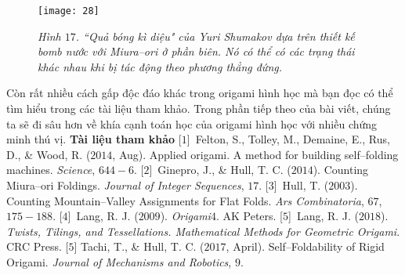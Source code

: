 \begin{multicols}{2}
\begin{figure}[H]
		\vspace*{4pt}
		\texttt{[image: 28]}
		\caption{\small\textit{\color{toanhocdoisong}Hình $17$. ``Quả bóng kì diệu" của Yuri Shumakov dựa trên thiết kế bomb nước với Miura--ori ở phần biên. Nó có thể có các trạng thái khác nhau khi bị tác động theo phương thẳng đứng.}}
		\vspace*{-5pt}
	\end{figure}
	Còn rất nhiều cách gấp độc đáo khác trong origami hình học mà bạn đọc có thể tìm hiểu trong các tài liệu tham khảo. Trong phần tiếp theo của bài viết, chúng ta sẽ đi sâu hơn về khía cạnh  toán học của origami hình học với nhiều chứng minh thú vị.
	\vskip 0.1cm
	\textbf{\color{toanhocdoisong}Tài liệu tham khảo}
	\vskip 0.1cm
	[$1$]~Felton, S., Tolley, M., Demaine, E., Rus, D., \& Wood, R. ($2014$, Aug). Applied origami. A method for building self--folding machines. \textit{Science}, $644-6$.
	\vskip 0.1cm
	[$2$]~Ginepro, J., \& Hull, T. C. ($2014$). Counting Miura--ori Foldings. \textit{Journal of Integer Sequences}, $17$.
	\vskip 0.1cm
	[$3$]~Hull, T. ($2003$). Counting Mountain--Valley Assignments for Flat Folds. \textit{Ars Combinatoria}, $67$, $175-188$.
	\vskip 0.1cm
	[$4$]~Lang, R. J. ($2009$). \textit{Origami$4$}. AK Peters.
	\vskip 0.1cm
	[$5$]~Lang, R. J. ($2018$). \textit{Twists, Tilings, and Tessellations. Mathematical Methods for Geometric Origami}. CRC Press.
	\vskip 0.1cm
	[$5$] Tachi, T., \& Hull, T. C. ($2017$, April). Self--Foldability of Rigid Origami. \textit{Journal of Mechanisms and Robotics}, $9$.
\end{multicols}
